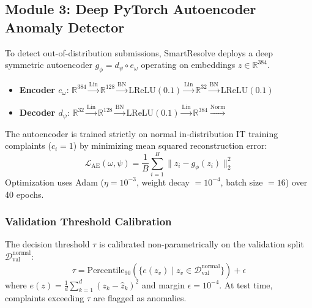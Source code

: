 \documentclass[conference]{IEEEtran}
\begin{document}
\subsection{Module 3: Deep PyTorch Autoencoder Anomaly Detector}
To detect out-of-distribution submissions, SmartResolve deploys a deep symmetric autoencoder $g_\phi = d_\psi \circ e_\omega$ operating on embeddings $z \in \mathbb{R}^{384}$.
\begin{itemize}
    \item \textbf{Encoder $e_\omega$}: $\mathbb{R}^{384} \xrightarrow{\text{Lin}} \mathbb{R}^{128} \xrightarrow{\text{BN}} \text{LReLU}(0.1) \xrightarrow{\text{Lin}} \mathbb{R}^{32} \xrightarrow{\text{BN}} \text{LReLU}(0.1)$
    \item \textbf{Decoder $d_\psi$}: $\mathbb{R}^{32} \xrightarrow{\text{Lin}} \mathbb{R}^{128} \xrightarrow{\text{BN}} \text{LReLU}(0.1) \xrightarrow{\text{Lin}} \mathbb{R}^{384} \xrightarrow{\text{Norm}}$
\end{itemize}

The autoencoder is trained strictly on normal in-distribution IT training complaints ($c_i = 1$) by minimizing mean squared reconstruction error:
\begin{equation}
\mathcal{L}_{\text{AE}}(\omega, \psi) = \frac{1}{B} \sum_{i=1}^B \|z_i - g_\phi(z_i)\|_2^2
\end{equation}
Optimization uses Adam ($\eta = 10^{-3}$, weight decay $= 10^{-4}$, batch size $= 16$) over 40 epochs.

\subsubsection{Validation Threshold Calibration}
The decision threshold $\tau$ is calibrated non-parametrically on the validation split $\mathcal{D}_{\text{val}}^{\text{normal}}$:
\begin{equation}
\tau = \text{Percentile}_{90}\left(\{e(z_v) \mid z_v \in \mathcal{D}_{\text{val}}^{\text{normal}}\}\right) + \epsilon
\end{equation}
where $e(z) = \frac{1}{d} \sum_{k=1}^d (z_k - \hat{z}_k)^2$ and margin $\epsilon = 10^{-4}$. At test time, complaints exceeding $\tau$ are flagged as anomalies.
\end{document}
